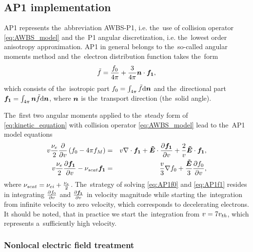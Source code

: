 \subsection{AP1 implementation}
\label{sec:C7code}

AP1 represents the~abbreviation AWBS-P1, i.e. the~use of collision operator 
\eqref{eq:AWBS_model} and the~P1 angular discretization, i.e. the~lowest order 
anisotropy approximation. AP1 in general belongs to the~so-called angular 
moments method and the~electron distribution function takes the~form
\begin{equation}
  \tilde{f} = \frac{f_0}{4\pi} + \frac{3}{4\pi}\boldsymbol{n}\cdot\boldsymbol{f_1} , 
  \nonumber \label{eq:P1approximation}
\end{equation}
which consists of the~isotropic part $f_0 = \int_{4\pi} \tilde{f} \text{d}\boldsymbol{n}$ 
and the~directional part $\boldsymbol{f_1} = \int_{4\pi} \boldsymbol{n}
\tilde{f} \text{d}\boldsymbol{n}$, where $\boldsymbol{n}$ is the~transport direction (the~solid angle).

The~first two angular moments applied to the~steady form of 
\eqref{eq:kinetic_equation} with collision operator \eqref{eq:AWBS_model} 
lead to the~AP1 model equations
\begin{eqnarray}
  v\frac{\nu_{e}}{2}\frac{\partial{}}{\partial{v}}\left(f_0 - 4\pi f_M \right) &=&
  v\nabla\cdot\boldsymbol{f_1} + \boldsymbol{\tilde{E}}\cdot
  \frac{\partial{\boldsymbol{f_1}}}{\partial{v}} + \frac{2}{v}\boldsymbol{\tilde{E}}\cdot\boldsymbol{f_1} , 
  \label{eq:AP1f0}\\
  v\frac{\nu_{e}}{2}\frac{\partial{\boldsymbol{f_1}}}{\partial{v}}
  - \nu_{scat}\boldsymbol{f_1} &=& 
  \frac{v}{3}\nabla f_0 + 
  \frac{\boldsymbol{\tilde{E}}}{3}\frac{\partial{f_0}}{\partial{v}} ,
  \label{eq:AP1f1}
\end{eqnarray}
where $\nu_{scat} = \nu_{ei} + \frac{\nu_{e}}{2}$. The~strategy of solving 
\eqref{eq:AP1f0} and \eqref{eq:AP1f1} resides in integrating 
$\frac{\partial{f_0}}{\partial{v}}$
and $\frac{\partial{\boldsymbol{f_1}}}{\partial{v}}$ in velocity magnitude while starting the~integration
from infinite velocity to zero velocity, which corresponds to decelerating 
electrons. It should be noted, that in practice we start the~integration from
$v = 7 v_{th}$, which represents a~sufficiently high velocity.

\subsubsection{Nonlocal electric field treatment}
\label{sec:Efield}

